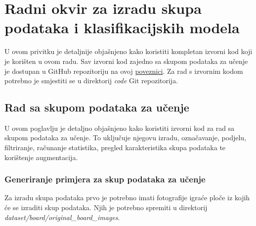 \documentclass[diplomskirad]{fer}
\begin{document}
\begin{izjavaoui}
  
\end{izjavaoui}



\backmatter

\chapter{Radni okvir za izradu skupa podataka i klasifikacijskih modela}
\label{appendix:dataset_and_model_framework}

	U ovom privitku je detaljnije objašnjeno kako koristiti kompletan izvorni kod koji je korišten u ovom radu. Sav izvorni kod zajedno sa skupom podataka za učenje je dostupan u GitHub repozitoriju na ovoj \href{https://github.com/PetarBelosevic/KingdomsApp}{poveznici}. Za rad s izvornim kodom potrebno je smjestiti se u direktorij \textit{code} Git repozitorija.
	
	\section{Rad sa skupom podataka za učenje}
		U ovom poglavlju je detaljno objašnjeno kako koristiti izvorni kod za rad sa skupom podataka za učenje. To uključuje njegovu izradu, označavanje, podjelu, filtriranje, računanje statistika, pregled karakteristika skupa podataka te korištenje augmentacija.
		
		\subsection{Generiranje primjera za skup podataka za učenje}
			Za izradu skupa podataka prvo je potrebno imati fotografije igraće ploče iz kojih će se izraditi skup podataka. Njih je potrebno spremiti u direktorij \textit{dataset/board/original\_board\_images}. 
			
\end{document}
